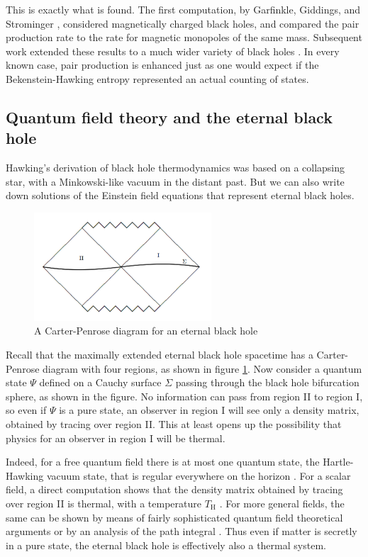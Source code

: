 \documentclass[12pt]{article}
\begin{document}
This is exactly what is found.  The first computation, by Garfinkle,
Giddings, and Strominger \cite{Garfinkle}, considered magnetically
charged black holes, and compared the pair production rate to the
rate for magnetic monopoles of the same mass.  Subsequent
work extended these results to a much wider variety of black holes
\cite{Brown,Dowker,MannRoss}.  In every known case, pair production
is enhanced just as one would expect if the Bekenstein-Hawking entropy
represented an actual counting of states.

\subsection{Quantum field theory and the eternal black hole \label{eterna}}

Hawking's derivation of black hole thermodynamics was based on a 
collapsing star, with a Minkowski-like vacuum
in the distant past.  But we can also write down solutions of the Einstein
field equations that represent eternal black holes.   
\begin{figure}
\centerline{\includegraphics[width=2.6in]{eternal.pdf}}
\caption{A Carter-Penrose diagram for an eternal black hole}
\label{Carlipfig3}
\end{figure}

Recall that the
maximally extended eternal black hole spacetime has a Carter-Penrose 
diagram with four regions, as shown in figure \ref{Carlipfig3}.
Now consider a quantum state $\Psi$ defined on a Cauchy surface 
$\Sigma$ passing through the black hole bifurcation sphere, as shown 
in the figure.  No information can pass from region II to region I, so even 
if $\Psi$ is a pure state, an observer in region I will see only a density 
matrix, obtained by tracing over region II.  This at least opens up the
possibility that physics for an observer in region I will be thermal.

Indeed, for a free quantum field there is at most one quantum state, 
the Hartle-Hawking vacuum state, that is regular everywhere on the 
horizon \cite{Waldbk,Kay}.   For a scalar field, a direct computation 
shows that the density matrix obtained by tracing over region II 
is thermal, with a temperature $T_{\scriptscriptstyle\mathrm{H}}$ 
\cite{Israelb}.  For more general fields, the same can be shown by 
means of fairly sophisticated quantum field theoretical arguments
\cite{Waldbk,Kay} or by an analysis of the path integral \cite{Jacobsond}.
Thus even if matter is secretly in a pure state, the eternal black hole is 
effectively also a thermal system.
\end{document}
